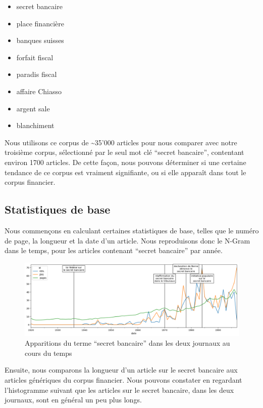 \documentclass[11pt]{article}
\begin{document}
\begin{itemize}
\item
  secret bancaire
\item
  place financière
\item
  banques suisses
\item
  forfait fiscal
\item
  paradis fiscal
\item
  affaire Chiasso
\item
  argent sale
\item
  blanchiment
\end{itemize}

Nous utilisons ce corpus de \textasciitilde{}35'000 articles pour nous
comparer avec notre troisième corpus, sélectionné par le seul mot clé
``secret bancaire'', contentant environ 1700 articles. De cette façon,
nous pouvons déterminer si une certaine tendance de ce corpus est
vraiment signifiante, ou si elle apparaît dans tout le corpus financier.

\hypertarget{statistiques-de-base}{%
\subsection{Statistiques de base}\label{statistiques-de-base}}

Nous commençons en calculant certaines statistiques de base, telles que
le numéro de page, la longueur et la date d'un article. Nous
reproduisons donc le N-Gram dans le temps, pour les articles contenant
``secret bancaire'' par année.

\begin{figure}
\centering
\includegraphics{methodology/ngram_ts.png}
\caption{Apparitions du terme ``secret bancaire'' dans les deux journaux
au cours du temps}
\end{figure}

Ensuite, nous comparons la longueur d'un article sur le secret bancaire
aux articles génériques du corpus financier. Nous pouvons constater en
regardant l'histogramme suivant que les articles sur le secret bancaire,
dans les deux journaux, sont en général un peu plus longs.
\end{document}
